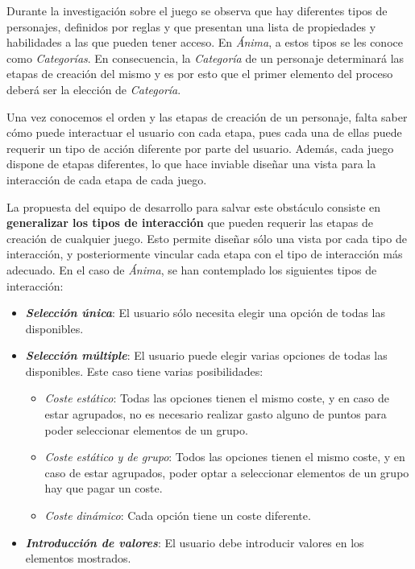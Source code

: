 Durante la investigación sobre el juego se observa que hay diferentes tipos de personajes, definidos por 
reglas y que presentan una lista de propiedades y habilidades a las que pueden tener acceso. En \textit{Ánima}, 
a estos tipos se les conoce como \textit{Categorías}. En consecuencia, la \textit{Categoría} de un personaje 
determinará las etapas de creación del mismo y es por esto que el primer elemento del proceso deberá ser 
la elección de \textit{Categoría}. \medskip

Una vez conocemos el orden y las etapas de creación de un personaje, falta saber cómo puede interactuar el usuario 
con cada etapa, pues cada una de ellas puede requerir un tipo de acción diferente por parte del usuario. Además, 
cada juego dispone de etapas diferentes, lo que hace inviable diseñar una vista para la interacción de cada etapa 
de cada juego. \medskip

La propuesta del equipo de desarrollo para salvar este obstáculo consiste en \textbf{generalizar los tipos de interacción} que pueden 
requerir las etapas de creación de cualquier juego. Esto permite diseñar sólo una vista por cada tipo de interacción, y posteriormente 
vincular cada etapa con el tipo de interacción más adecuado. En el caso de \textit{Ánima}, se han contemplado los siguientes 
tipos de interacción: 

\begin{itemize}
    \item \textit{\textbf{Selección única}}: El usuario sólo necesita elegir una opción de todas las disponibles.
    \item \textit{\textbf{Selección múltiple}}: El usuario puede elegir varias opciones de todas las disponibles. 
    Este caso tiene varias posibilidades:
    \begin{itemize}
        \item \textit{Coste estático}: Todas las opciones tienen el mismo coste, y en caso de estar agrupados, no es necesario 
        realizar gasto alguno de puntos para poder seleccionar elementos de un grupo.
        \item \textit{Coste estático y de grupo}: Todos las opciones tienen el mismo coste, y en caso de estar agrupados, poder 
        optar a seleccionar elementos de un grupo hay que pagar un coste.
        \item \textit{Coste dinámico}: Cada opción tiene un coste diferente.
    \end{itemize}
    \item \textit{\textbf{Introducción de valores}}: El usuario debe introducir valores en los elementos mostrados.
\end{itemize}\medskip

